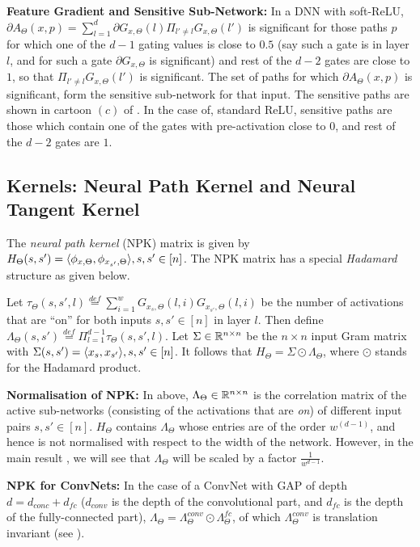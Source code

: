 \textbf{Feature Gradient and Sensitive Sub-Network:} In a DNN with soft-ReLU, $\partial A_{\Theta}(x,p)=\sum_{l=1}^d \partial G_{x,\Theta}(l)\Pi_{l'\neq l}G_{x,\Theta}(l')$ is significant for those paths $p$ for which one of the $d-1$ gating values is close to $0.5$ (say such a gate is in layer $l$, and for such a gate $\partial G_{x,\Theta}$ is significant) and rest of the $d-2$ gates are close to $1$, so that $\Pi_{l'\neq l}G_{x,\Theta}(l')$ is significant. The set of paths for which $\partial A_{\Theta}(x,p)$ is significant, form the sensitive sub-network for that input. The sensitive paths are shown in cartoon $(c)$ of . In the case of, standard ReLU, sensitive paths are those which contain one of the gates with pre-activation close to $0$, and rest of the $d-2$ gates are $1$.
\subsection{Kernels: Neural Path Kernel and Neural Tangent Kernel}\label{sec:ker}
The \emph{neural path kernel} (NPK) matrix is given by $H_{\Theta}(s,s')=\langle \phi_{x,\Theta},\phi_{x_{s'},\Theta}\rangle, s, s'\in[n]$. The NPK matrix has a special \emph{Hadamard} structure as given below.
\begin{lemma}\label{lm:npk}
Let $\tau_{\Theta}(s,s',l)\stackrel{def}=\sum_{i=1}^w G_{x_s,\Theta}(l,i)G_{x_{s'},\Theta}(l,i)$ be the number of activations that are ``on'' for both inputs $s,s'\in[n]$ in layer $l$. Then define $\Lambda_{\Theta}(s,s')\stackrel{def}=\Pi_{l=1}^{d-1}\tau_{\Theta}(s,s',l)$.
Let $\Sigma \in \mathbb{R}^{n\times n}$ be the $n\times n $ input Gram matrix with  $\Sigma(s,s')=\langle x_s,x_{s'}\rangle,s,s'\in[n]$. It follows that $H_{\Theta}= \Sigma\odot\Lambda_{\Theta}$, where $\odot$ stands for the Hadamard product. 
\end{lemma}
\textbf{Normalisation of NPK:} In  above, $\Lambda_{\Theta}\in\mathbb{R}^{n\times n}$ is the correlation matrix of the active sub-networks (consisting of the activations that are \emph{on}) of different input pairs $s,s'\in[n]$. $H_{\Theta}$ contains $\Lambda_{\Theta}$ whose entries are of the order $w^{(d-1)}$, and hence is not normalised with respect to the width of the network.  However, in the main result , we will see that $\Lambda_{\Theta}$ will be scaled by a factor $\frac{1}{w^{d-1}}$. 

\textbf{NPK for ConvNets:} In the case of a ConvNet  with GAP of depth $d=d_{conc}+d_{fc}$ ($d_{conv}$ is the depth of the convolutional part, and $d_{fc}$ is the depth of the fully-connected part), $\Lambda_{\Theta}=\Lambda^{conv}_{\Theta}\odot\Lambda^{fc}_{\Theta}$, of which $\Lambda^{conv}_{\Theta}$ is translation invariant (see ). 

